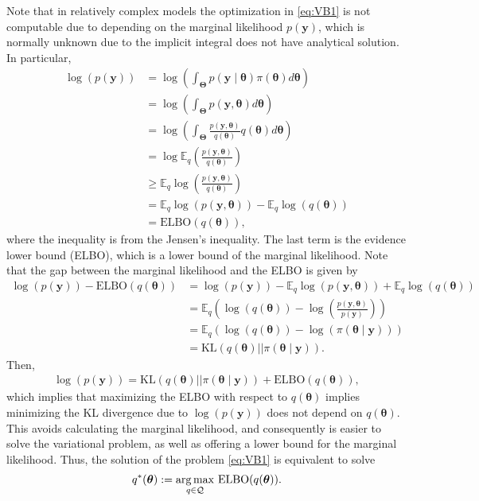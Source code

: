 Note that in relatively complex models the optimization in \ref{eq:VB1}  is not computable due to depending on the marginal likelihood $p(\boldsymbol{y})$, which is normally unknown due to the implicit integral does not have analytical solution. In particular,
\begin{align*}
	\log(p(\boldsymbol{y}))&=\log\left(\int_{\boldsymbol{\Theta}}p(\boldsymbol{y}\mid \boldsymbol{\theta})\pi(\boldsymbol{\theta})d\boldsymbol{\theta}\right)\\
	&=\log\left(\int_{\boldsymbol{\Theta}}p(\boldsymbol{y}, \boldsymbol{\theta})d\boldsymbol{\theta}\right)\\
	&=\log\left(\int_{\boldsymbol{\Theta}}\frac{p(\boldsymbol{y}, \boldsymbol{\theta})}{q(\boldsymbol{\theta})}q(\boldsymbol{\theta})d\boldsymbol{\theta}\right)\\
	&=\log \mathbb{E}_q\left(\frac{p(\boldsymbol{y}, \boldsymbol{\theta})}{q(\boldsymbol{\theta})}\right)\\
	&\geq \mathbb{E}_q\log\left(\frac{p(\boldsymbol{y}, \boldsymbol{\theta})}{q(\boldsymbol{\theta})}\right)\\
	&=\mathbb{E}_q\log(p(\boldsymbol{y}, \boldsymbol{\theta}))-\mathbb{E}_q\log(q(\boldsymbol{\theta}))\\
	&=\text{ELBO}(q(\boldsymbol{\theta})),
\end{align*}
where the inequality is from the Jensen's inequality. The last term is the evidence lower bound (ELBO), which is a lower bound of the marginal likelihood.
Note that the gap between the marginal likelihood and the ELBO is given by
\begin{align*}
	\log(p(\boldsymbol{y})) - \text{ELBO}(q(\boldsymbol{\theta})) & = \log(p(\boldsymbol{y})) - \mathbb{E}_q\log(p(\boldsymbol{y}, \boldsymbol{\theta}))+\mathbb{E}_q\log(q(\boldsymbol{\theta}))\\
	&=\mathbb{E}_q\left(\log(q(\boldsymbol{\theta}))-\log\left(\frac{p(\boldsymbol{y}, \boldsymbol{\theta})}{p(\boldsymbol{y})}\right)\right)\\
	&=\mathbb{E}_q\left(\log(q(\boldsymbol{\theta}))-\log(\pi(\boldsymbol{\theta}\mid \boldsymbol{y}))\right)\\
	&=\text{KL}(q(\boldsymbol{\theta})||\pi(\boldsymbol{\theta} \mid \mathbf{y})).	 
\end{align*}
Then,
\begin{align*}
	\log(p(\boldsymbol{y})) = \text{KL}(q(\boldsymbol{\theta})||\pi(\boldsymbol{\theta} \mid \mathbf{y})) + \text{ELBO}(q(\boldsymbol{\theta})),  
\end{align*} 
which implies that maximizing the ELBO with respect to $q(\boldsymbol{\theta})$ implies minimizing the KL divergence due to $\log(p(\boldsymbol{y}))$ does not depend on $q(\boldsymbol{\theta})$. This avoids calculating the marginal likelihood, and consequently is easier to solve the variational problem, as well as offering a lower bound for the marginal likelihood. Thus, the solution of the problem \ref{eq:VB1} is equivalent to solve
\begin{align*}
	q^*(\boldsymbol{\theta}):=\underset{q \in \mathcal{Q}}{\operatorname*{arg\,max}} \  \text{ELBO}(q(\boldsymbol{\theta})).
\end{align*} 


